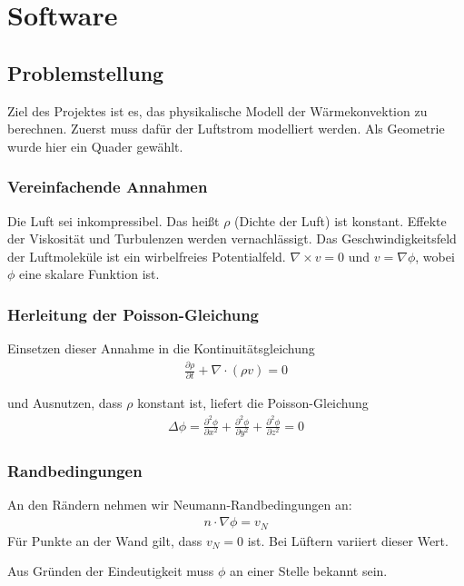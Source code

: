 \section{Software}

\subsection{Problemstellung}
Ziel des Projektes ist es, das physikalische Modell der Wärmekonvektion zu berechnen.
Zuerst muss dafür der Luftstrom modelliert werden. Als Geometrie wurde hier ein Quader gewählt.

\subsubsection{Vereinfachende Annahmen}

Die Luft sei inkompressibel. Das heißt $\rho$ (Dichte der Luft) ist konstant.
Effekte der Viskosität und Turbulenzen werden vernachlässigt.
Das Geschwindigkeitsfeld der Luftmoleküle ist ein wirbelfreies Potentialfeld.
$\nabla \times v =0$ und $v= \nabla \phi$, wobei $\phi$ eine skalare Funktion ist.

\subsubsection{Herleitung der Poisson-Gleichung}

Einsetzen dieser Annahme in die Kontinuitätsgleichung
\begin{align*}
\frac{\partial \rho}{\partial t}+\nabla \cdot (\rho v)=0
\end{align*}

und Ausnutzen, dass $\rho$ konstant ist, liefert die Poisson-Gleichung
\begin{align*}
\Delta \phi = \frac{\partial^2 \phi}{\partial x^2}+\frac{\partial^2 \phi}{\partial y^2}+\frac{\partial^2 \phi}{\partial z^2}=0
\end{align*}

\subsubsection{Randbedingungen}
An den Rändern nehmen wir Neumann-Randbedingungen an:
\begin{align*}
n \cdot \nabla \phi =v_N
\end{align*}
Für Punkte an der Wand gilt, dass $v_N=0$ ist. Bei Lüftern variiert dieser Wert.

Aus Gründen der Eindeutigkeit muss $\phi$ an einer Stelle bekannt sein. 

